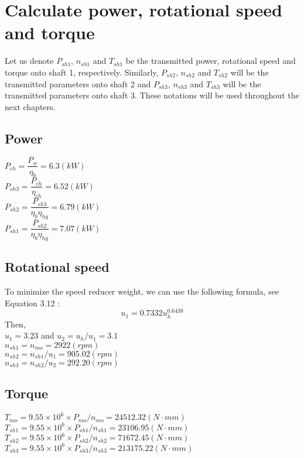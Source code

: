 \section{Calculate power, rotational speed and torque}
Let us denote $ P_{sh1} $, $ n_{sh1} $ and $ T_{sh1} $ be the transmitted power, rotational speed and torque onto shaft 1, respectively. Similarly, $ P_{sh2} $, $ n_{sh2} $ and $ T_{sh2} $ will be the transmitted parameters onto shaft 2 and $ P_{sh3} $, $ n_{sh3} $ and $ T_{sh3} $ will be the transmitted parameters onto shaft 3. These notations will be used throughout the next chapters.
\subsection{Power}
$ P_{ch} = \dfrac{P_w}{\eta_b} = 6.3 \unit{(kW)}$\\
$ P_{sh3} = \dfrac{P_{ch}}{\eta_{ch}} = 6.52 \unit{(kW)}$\\
$ P_{sh2} = \dfrac{P_{sh3}}{\eta_b\eta_{hg}} = 6.79 \unit{(kW)}$\\
$ P_{sh1} = \dfrac{P_{sh2}}{\eta_b\eta_{hg}} = 7.07 \unit{(kW)}$
\subsection{Rotational speed}
To minimize the speed reducer weight, we can use the following formula, see Equation 3.12 \cite{tk1}:
\[u_1=0.7332u_h^{0.6438}\]
Then,\\
$ u_1=3.23$ and $ u_2=u_h/u_1=3.1 $\\
$ n_{sh1} = n_{mo} = 2922\unit{(rpm)}$\\
$ n_{sh2} = {n_{sh1}}/{u_{1}} = 905.02 \unit{(rpm)}$\\
$ n_{sh3} = {n_{sh2}}/{u_{2}} = 292.20 \unit{(rpm)}$

\subsection{Torque}
$ T_{mo} = 9.55\times10^6 \times P_{mo}/n_{mo} = 24512.32 \unit{(N\cdot mm)}$\\
$ T_{sh1} = 9.55\times10^6 \times{P_{sh1}}/{n_{sh1}} = 23106.95 \unit{(N\cdot mm)}$\\
$ T_{sh2} = 9.55\times10^6 \times{P_{sh2}}/{n_{sh2}} = 71672.45 \unit{(N\cdot mm)}$\\
$ T_{sh3} = 9.55\times10^6 \times{P_{sh3}}/{n_{sh3}} = 213175.22 \unit{(N\cdot mm)}$\\

